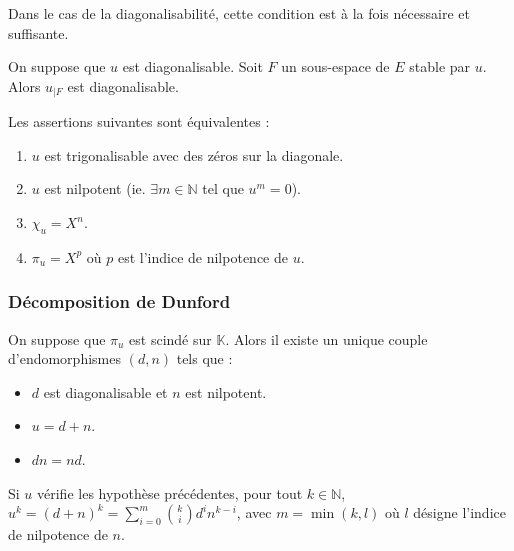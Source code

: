 	\begin{remark}
		Dans le cas de la diagonalisabilité, cette condition est à la fois nécessaire et suffisante.
	\end{remark}


	\begin{proposition}
		On suppose que $u$ est diagonalisable. Soit $F$ un sous-espace de $E$ stable par $u$. Alors $u_{|F}$ est diagonalisable.
	\end{proposition}


	\begin{application}
		Les assertions suivantes sont équivalentes :
		\begin{enumerate}[label=(\roman*)]
			\item $u$ est trigonalisable avec des zéros sur la diagonale.
			\item $u$ est nilpotent (ie. $\exists m \in \mathbb{N}$ tel que $u^m = 0$).
			\item $\chi_u = X^n$.
			\item $\pi_u = X^p$ où $p$ est l'indice de nilpotence de $u$.
		\end{enumerate}
	\end{application}

	\subsubsection{Décomposition de Dunford}


	\begin{theorem}
		On suppose que $\pi_u$ est scindé sur $\mathbb{K}$. Alors il existe un unique couple d'endomorphismes $(d, n)$ tels que :
		\begin{itemize}
			\item $d$ est diagonalisable et $n$ est nilpotent.
			\item $u = d + n$.
			\item $d n = n d$.
		\end{itemize}
	\end{theorem}

	\begin{corollary}
		Si $u$ vérifie les hypothèse précédentes, pour tout $k \in \mathbb{N}$, $u^k = (d + n)^k = \sum_{i=0}^m \binom{k}{i} d^i n^{k-i}$, avec $m = \min(k, l)$ où $l$ désigne l'indice de nilpotence de $n$.
	\end{corollary}

